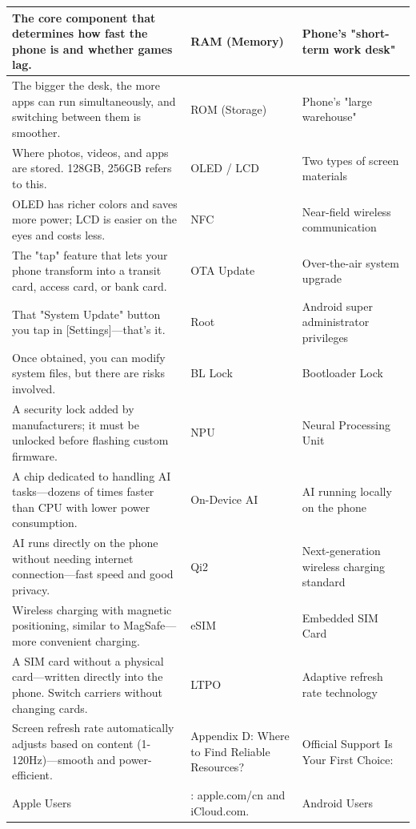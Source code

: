 
\begin{center}
\begin{tabularx}{\linewidth}{|X|X|X|}
\hline
\textbf{The core component that determines how fast the phone is and whether games lag.} & \textbf{RAM (Memory)} & \textbf{Phone's "short-term work desk"} \tabularnewline
\hline
The bigger the desk, the more apps can run simultaneously, and switching between them is smoother. & ROM (Storage) & Phone's "large warehouse" \tabularnewline
Where photos, videos, and apps are stored. 128GB, 256GB refers to this. & OLED / LCD & Two types of screen materials \tabularnewline
OLED has richer colors and saves more power; LCD is easier on the eyes and costs less. & NFC & Near-field wireless communication \tabularnewline
The "tap" feature that lets your phone transform into a transit card, access card, or bank card. & OTA Update & Over-the-air system upgrade \tabularnewline
That "System Update" button you tap in [Settings]—that's it. & Root & Android super administrator privileges \tabularnewline
Once obtained, you can modify system files, but there are risks involved. & BL Lock & Bootloader Lock \tabularnewline
A security lock added by manufacturers; it must be unlocked before flashing custom firmware. & NPU & Neural Processing Unit \tabularnewline
A chip dedicated to handling AI tasks—dozens of times faster than CPU with lower power consumption. & On-Device AI & AI running locally on the phone \tabularnewline
AI runs directly on the phone without needing internet connection—fast speed and good privacy. & Qi2 & Next-generation wireless charging standard \tabularnewline
Wireless charging with magnetic positioning, similar to MagSafe—more convenient charging. & eSIM & Embedded SIM Card \tabularnewline
A SIM card without a physical card—written directly into the phone. Switch carriers without changing cards. & LTPO & Adaptive refresh rate technology \tabularnewline
Screen refresh rate automatically adjusts based on content (1-120Hz)—smooth and power-efficient. & Appendix D: Where to Find Reliable Resources? & Official Support Is Your First Choice: \tabularnewline
Apple Users & : apple.com/cn and iCloud.com. & Android Users \tabularnewline
\hline
\end{tabularx}
\end{center}
